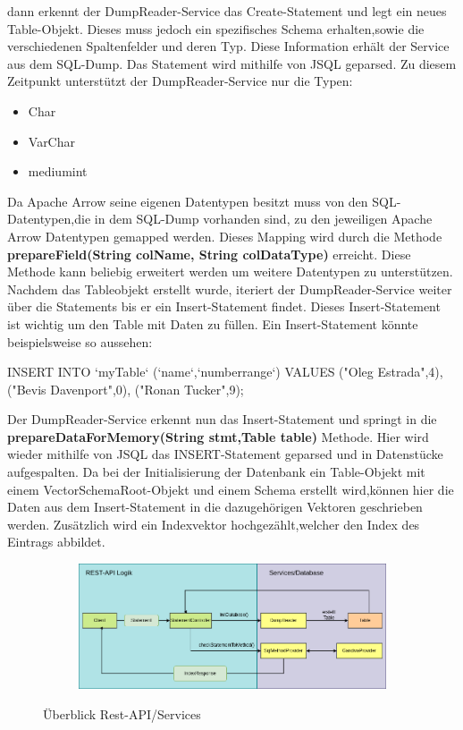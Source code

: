 dann erkennt der DumpReader-Service das Create-Statement und legt ein neues Table-Objekt. Dieses muss jedoch ein spezifisches Schema erhalten,sowie die verschiedenen Spaltenfelder und deren Typ.
Diese Information erhält der Service aus dem SQL-Dump.
Das Statement wird mithilfe von JSQL geparsed.
Zu diesem Zeitpunkt unterstützt der DumpReader-Service nur die Typen:

\begin{itemize}
 \item Char
 \item VarChar
 \item mediumint
\end{itemize}

Da Apache Arrow seine eigenen Datentypen besitzt muss von den SQL-Datentypen,die in dem SQL-Dump vorhanden sind, zu den jeweiligen Apache Arrow Datentypen gemapped werden. 
Dieses Mapping wird durch die Methode \textbf{prepareField(String colName, String colDataType)} erreicht.
Diese Methode kann beliebig erweitert werden um weitere Datentypen zu unterstützen.\\
Nachdem das Tableobjekt erstellt wurde, iteriert der DumpReader-Service weiter über die Statements bis er ein Insert-Statement findet. Dieses Insert-Statement ist wichtig um den Table mit Daten zu füllen.
Ein Insert-Statement könnte beispielsweise so aussehen:\\

\begin{terminalblock}
  \begin{textcode}
INSERT INTO `myTable` (`name`,`numberrange`)
VALUES
  ("Oleg Estrada",4),
  ("Bevis Davenport",0),
  ("Ronan Tucker",9);
  \end{textcode}
\end{terminalblock}

Der DumpReader-Service erkennt nun das Insert-Statement und springt in die \textbf{prepareDataForMemory(String stmt,Table table)} Methode. Hier wird wieder mithilfe von JSQL das INSERT-Statement geparsed und in Datenstücke aufgespalten.
Da bei der Initialisierung der Datenbank ein Table-Objekt mit einem VectorSchemaRoot-Objekt und einem Schema erstellt wird,können hier die Daten aus dem Insert-Statement in die dazugehörigen Vektoren geschrieben werden.
Zusätzlich wird ein Indexvektor hochgezählt,welcher den Index des Eintrags abbildet.


\begin{figure}[h]
  \centering
  \begin{subfigure}[b]{1.0\textwidth}
    \includegraphics[width=1.0\linewidth]{img/logic}
  \end{subfigure}
  \caption{Überblick Rest-API/Services}
  \label{graf_3}
\end{figure}






